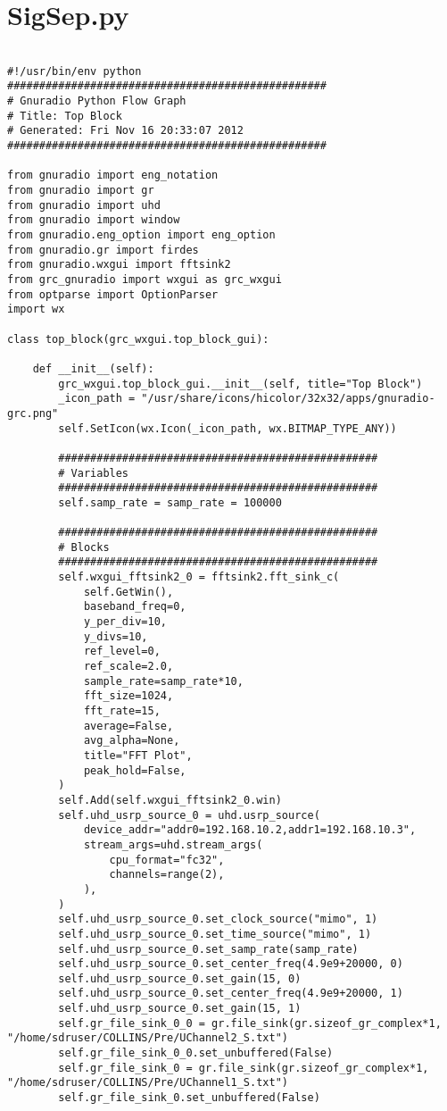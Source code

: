 \chapter{SigSep.py}

\begin{lstlisting}[breaklines]

#!/usr/bin/env python
##################################################
# Gnuradio Python Flow Graph
# Title: Top Block
# Generated: Fri Nov 16 20:33:07 2012
##################################################

from gnuradio import eng_notation
from gnuradio import gr
from gnuradio import uhd
from gnuradio import window
from gnuradio.eng_option import eng_option
from gnuradio.gr import firdes
from gnuradio.wxgui import fftsink2
from grc_gnuradio import wxgui as grc_wxgui
from optparse import OptionParser
import wx

class top_block(grc_wxgui.top_block_gui):

	def __init__(self):
		grc_wxgui.top_block_gui.__init__(self, title="Top Block")
		_icon_path = "/usr/share/icons/hicolor/32x32/apps/gnuradio-grc.png"
		self.SetIcon(wx.Icon(_icon_path, wx.BITMAP_TYPE_ANY))

		##################################################
		# Variables
		##################################################
		self.samp_rate = samp_rate = 100000

		##################################################
		# Blocks
		##################################################
		self.wxgui_fftsink2_0 = fftsink2.fft_sink_c(
			self.GetWin(),
			baseband_freq=0,
			y_per_div=10,
			y_divs=10,
			ref_level=0,
			ref_scale=2.0,
			sample_rate=samp_rate*10,
			fft_size=1024,
			fft_rate=15,
			average=False,
			avg_alpha=None,
			title="FFT Plot",
			peak_hold=False,
		)
		self.Add(self.wxgui_fftsink2_0.win)
		self.uhd_usrp_source_0 = uhd.usrp_source(
			device_addr="addr0=192.168.10.2,addr1=192.168.10.3",
			stream_args=uhd.stream_args(
				cpu_format="fc32",
				channels=range(2),
			),
		)
		self.uhd_usrp_source_0.set_clock_source("mimo", 1)
		self.uhd_usrp_source_0.set_time_source("mimo", 1)
		self.uhd_usrp_source_0.set_samp_rate(samp_rate)
		self.uhd_usrp_source_0.set_center_freq(4.9e9+20000, 0)
		self.uhd_usrp_source_0.set_gain(15, 0)
		self.uhd_usrp_source_0.set_center_freq(4.9e9+20000, 1)
		self.uhd_usrp_source_0.set_gain(15, 1)
		self.gr_file_sink_0_0 = gr.file_sink(gr.sizeof_gr_complex*1, "/home/sdruser/COLLINS/Pre/UChannel2_S.txt")
		self.gr_file_sink_0_0.set_unbuffered(False)
		self.gr_file_sink_0 = gr.file_sink(gr.sizeof_gr_complex*1, "/home/sdruser/COLLINS/Pre/UChannel1_S.txt")
		self.gr_file_sink_0.set_unbuffered(False)


\end{lstlisting}
